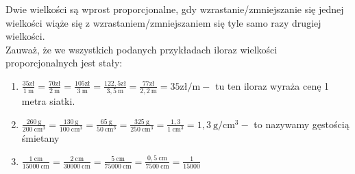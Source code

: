 \documentclass[10pt]{article}
\begin{document}
Dwie wielkości są wprost proporcjonalne, gdy wzrastanie/zmniejszanie się jednej wielkości wiąże się z wzrastaniem/zmniejszaniem się tyle samo razy drugiej wielkości.\\
Zauważ, że we wszystkich podanych przykładach iloraz wielkości proporcjonalnych jest stały:

\begin{enumerate}
  \item \(\frac{35 \mathrm{zł}}{1 \mathrm{~m}}=\frac{70 \mathrm{zł}}{2 \mathrm{~m}}=\frac{105 \mathrm{zł}}{3 \mathrm{~m}}=\frac{122,5 \mathrm{zł}}{3,5 \mathrm{~m}}=\frac{77 \mathrm{zł}}{2,2 \mathrm{~m}}=35 \mathrm{zł} / \mathrm{m}-\) tu ten iloraz wyraża cenę 1 metra siatki.
  \item \(\frac{260 \mathrm{~g}}{200 \mathrm{~cm}^{3}}=\frac{130 \mathrm{~g}}{100 \mathrm{~cm}^{3}}=\frac{65 \mathrm{~g}}{50 \mathrm{~cm}^{3}}=\frac{325 \mathrm{~g}}{250 \mathrm{~cm}^{3}}=\frac{1,3}{1 \mathrm{~cm}^{3}}=1,3 \mathrm{~g} / \mathrm{cm}^{3}-\) to nazywamy gęstością śmietany
  \item \(\frac{1 \mathrm{~cm}}{15000 \mathrm{~cm}}=\frac{2 \mathrm{~cm}}{30000 \mathrm{~cm}}=\frac{5 \mathrm{~cm}}{75000 \mathrm{~cm}}=\frac{0,5 \mathrm{~cm}}{7500 \mathrm{~cm}}=\frac{1}{15000}\)
\end{enumerate}
\end{document}
